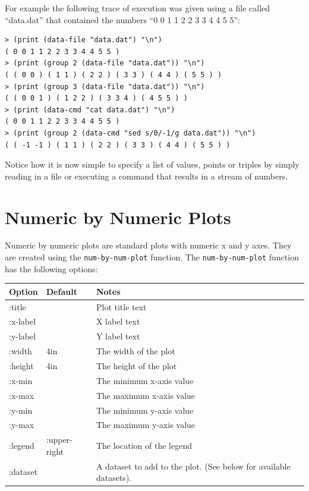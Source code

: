 \documentclass{article}
\begin{document}
For example the following trace of execution was given using a file
called ``data.dat'' that contained the numbers ``0 0 1 1 2 2 3 3 4 4 5
5'':
\begin{verbatim}
> (print (data-file "data.dat") "\n")
( 0 0 1 1 2 2 3 3 4 4 5 5 )
> (print (group 2 (data-file "data.dat")) "\n")
( ( 0 0 ) ( 1 1 ) ( 2 2 ) ( 3 3 ) ( 4 4 ) ( 5 5 ) )
> (print (group 3 (data-file "data.dat")) "\n")
( ( 0 0 1 ) ( 1 2 2 ) ( 3 3 4 ) ( 4 5 5 ) )
> (print (data-cmd "cat data.dat") "\n")
( 0 0 1 1 2 2 3 3 4 4 5 5 )
> (print (group 2 (data-cmd "sed s/0/-1/g data.dat")) "\n")
( ( -1 -1 ) ( 1 1 ) ( 2 2 ) ( 3 3 ) ( 4 4 ) ( 5 5 ) )
\end{verbatim}
Notice how it is now simple to specify a list of values, points or
triples by simply reading in a file or executing a command that
results in a stream of numbers.

\section{\label{sect:num-by-num} Numeric by Numeric Plots}

Numeric by numeric plots are standard plots with numeric x and y
axes.  They are created using the {\tt num-by-num-plot} function.  The
{\tt num-by-num-plot} function has the following options:

\begin{center}
\begin{tabular}{lll}
Option & Default & Notes \\
\hline
:title & & Plot title text\\
:x-label & & X label text\\
:y-label & & Y label text\\
:width & 4in & The width of the plot\\
:height & 4in & The height of the plot\\
:x-min & & The minimum x-axis value\\
:x-max & & The maximum x-axis value\\
:y-min & & The minimum y-axis value\\
:y-max & & The maximum y-axis value\\
:legend & :upper-right & The location of the legend \\
:dataset & & A dataset to add to the plot.  (See below for available
datasets).\\
\end{tabular}
\end{center}
\end{document}
